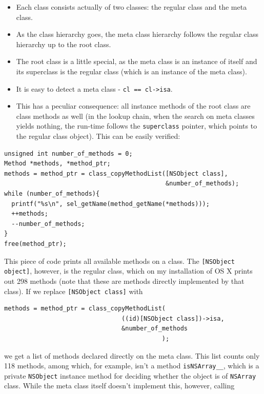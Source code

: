 \begin{itemize}
\item Each class consists actually of two classes: the regular class and the meta class.
\item As the class hierarchy goes, the meta class hierarchy follows the regular class hierarchy up to the root class.
\item The root class is a little special, as the meta class is an instance of itself and its superclass is the regular class (which is an instance of the meta class).
\item It is easy to detect a meta class - \verb:cl == cl->isa:.
\item This has a peculiar consequence: all instance methods of the root class are class methods as well (in the lookup chain, when the search on meta classes yields nothing, the run-time follows the \verb=superclass= pointer, which points to the regular class object). This can be easily verified:
\end{itemize}

\begin{verbatim}
unsigned int number_of_methods = 0;
Method *methods, *method_ptr;
methods = method_ptr = class_copyMethodList([NSObject class], 
                                            &number_of_methods);
while (number_of_methods){
  printf("%s\n", sel_getName(method_getName(*methods)));
  ++methods;
  --number_of_methods;
}
free(method_ptr);
\end{verbatim}

This piece of code prints all available methods on a class. The \verb=[NSObject object]=, however, is the regular class, which on my installation of OS X prints out 298 methods (note that these are methods directly implemented by that class). If we replace \verb=[NSObject class]= with

\begin{verbatim}
methods = method_ptr = class_copyMethodList(
                                ((id)[NSObject class])->isa, 
                                &number_of_methods
                                           );
\end{verbatim}

we get a list of methods declared directly on the meta class. This list counts only 118 methods, among which, for example, isn't a method \verb=isNSArray__=, which is a private \verb=NSObject= instance method for deciding whether the object is of \verb=NSArray= class. While the meta class itself doesn't implement this, however, calling

